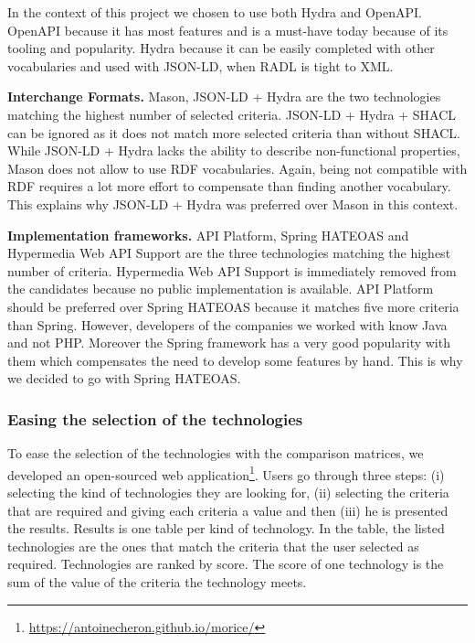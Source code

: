 In the context of this project we chosen to use both Hydra and OpenAPI. OpenAPI because it has most features and is a must-have today because of its tooling and popularity. Hydra because it can be easily completed with other vocabularies and used with JSON-LD, when RADL is tight to XML.

\textbf{Interchange Formats.} Mason, JSON-LD + Hydra are the two technologies matching the highest number of selected criteria. JSON-LD + Hydra + SHACL can be ignored as it does not match more selected criteria than without SHACL. While JSON-LD + Hydra lacks the ability to describe non-functional properties, Mason does not allow to use RDF vocabularies. Again, being not compatible with RDF requires a lot more effort to compensate than finding another vocabulary. This explains why JSON-LD + Hydra was preferred over Mason in this context.

\textbf{Implementation frameworks.} API Platform, Spring HATEOAS and Hypermedia Web API Support \cite{salvadori2014framework} are the three technologies matching the highest number of criteria. Hypermedia Web API Support is immediately removed from the candidates because no public implementation is available. API Platform should be preferred over Spring HATEOAS because it matches five more criteria than Spring. However, developers of the companies we worked with know Java and not PHP. Moreover the Spring framework has a very good popularity with them which compensates the need to develop some features by hand. This is why we decided to go with Spring HATEOAS.

\subsubsection{Easing the selection of the technologies}

To ease the selection of the technologies with the comparison matrices, we developed an open-sourced web application\footnote{\url{https://antoinecheron.github.io/morice/}}. Users go through three steps: (i) selecting the kind of technologies they are looking for, (ii) selecting the criteria that are required and giving each criteria a value and then (iii) he is presented the results. Results is one table per kind of technology. In the table, the listed technologies are the ones that match the criteria that the user selected as required. Technologies are ranked by score. The score of one technology is the sum of the value of the criteria the technology meets.

